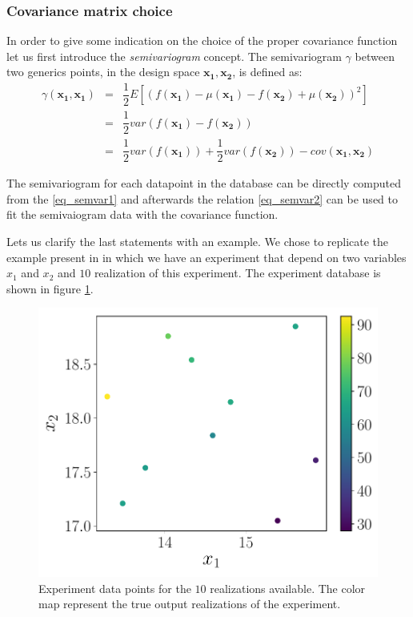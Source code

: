 \subsubsection{Covariance matrix choice}
\label{sec:cov}

In order to give some indication on the choice of the proper covariance function let us first introduce the \textit{semivariogram} concept.
The semivariogram $\gamma$ between two generics points, in the design space  $\mathbf{x_1}, \mathbf{x_2}$, is defined as:
\begin{eqnarray}
\gamma(\mathbf{x_1}, \mathbf{x_1}) &=& \dfrac{1}{2} E \left[  (f(\mathbf{x_1}) -\mu(\mathbf{x_1}) -f(\mathbf{x_2}) +\mu(\mathbf{x_2}))^2 \right] \label{eq_semvar1}\\
&=& \dfrac{1}{2} var(f(\mathbf{x_1}) -f(\mathbf{x_2}) ) \nonumber \\
&=& \dfrac{1}{2} var(f(\mathbf{x_1}))  +\dfrac{1}{2} var(f(\mathbf{x_2})) -cov(\mathbf{x_1}, \mathbf{x_2}) \label{eq_semvar2}
\end{eqnarray}

The semivariogram for each datapoint in the database can be directly computed from the \eqref{eq_semvar1} and afterwards the relation \eqref{eq_semvar2} can be used to fit the semivaiogram data with the covariance function.

Lets us clarify the last statements with an example. We chose to replicate the example present in \citet{cavazzuti2012optimization} in which we have an experiment that depend on two variables $x_1$ and $x_2$ and $10$ realization of this experiment. The experiment database is shown in figure \ref{fig:doedata}.

\begin{figure}[t]
	\centering
	\includegraphics[width=0.5\linewidth]{appendix_a/DOE_data}
	\caption{Experiment data points for the $10$ realizations available. The color map represent the true output realizations of the experiment.}
	\label{fig:doedata}
\end{figure}

